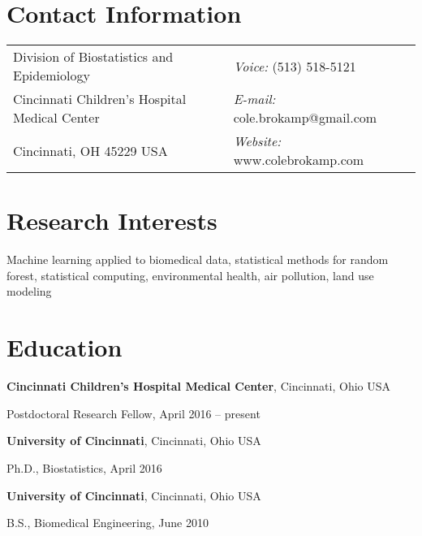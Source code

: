 \documentclass[margin,line]{res}
\newenvironment{list1}{
  \begin{list}{\ding{113}}{%
      \setlength{\itemsep}{0in}
      \setlength{\parsep}{0in} \setlength{\parskip}{0in}
      \setlength{\topsep}{0in} \setlength{\partopsep}{0in} 
      \setlength{\leftmargin}{0.17in}}}{\end{list}}
\begin{document}

\begin{resume}
\section{\sc Contact Information}
\vspace{.05in}
\begin{tabular}{@{}p{3in}p{4in}}      
Division of Biostatistics and Epidemiology & {\it Voice:}  (513) 518-5121 \\         
Cincinnati Children's Hospital Medical Center & {\it E-mail:}  cole.brokamp@gmail.com\\       
Cincinnati, OH 45229 USA  & {\it Website:} www.colebrokamp.com \\     
\end{tabular}


\section{\sc Research Interests}
Machine learning applied to biomedical data, statistical methods for random forest,
statistical computing, environmental health, air pollution, land use modeling

\section{\sc Education}

{\bf Cincinnati Children's Hospital Medical Center}, Cincinnati, Ohio USA \\
\vspace*{-.1in}
\begin{list1}
    \item[]Postdoctoral Research Fellow, April 2016 -- present
\end{list1}

{\bf University of Cincinnati}, Cincinnati, Ohio USA \\
\vspace*{-.1in}
\begin{list1}
\item[]Ph.D., Biostatistics, April 2016
\end{list1}

{\bf University of Cincinnati}, Cincinnati, Ohio USA\\
\vspace*{-.1in}
\begin{list1}
\item[]B.S., Biomedical Engineering,  June 2010
\end{list1}



\end{resume}
\end{document}
